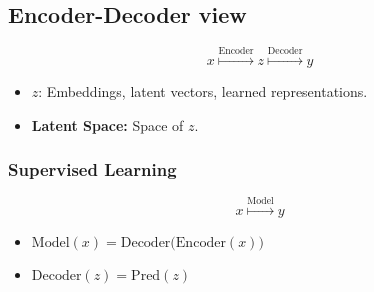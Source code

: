 \subsection{Encoder-Decoder view}
\begin{definition}
    \begin{equation}
        x \overset{\text{Encoder}}{\mapsto} z \overset{\text{Decoder}}{\mapsto} y
    \end{equation}
    \begin{itemize}
        \item $z$: Embeddings, latent vectors, learned representations.
        \item \textbf{Latent Space:} Space of $z$.
    \end{itemize}
\end{definition}

\subsubsection{Supervised Learning}
\begin{example} 
    \begin{equation}
        x \overset{\text{Model}}{\mapsto} y
    \end{equation}
    \begin{itemize}
        \item $\mathrm{Model}(x) = \mathrm{Decoder}\bigl(\mathrm{Encoder}(x)\bigr)$
        \item $\mathrm{Decoder}(z) = \mathrm{Pred}(z)$
    \end{itemize}
    
\end{example}

